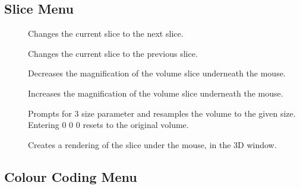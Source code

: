 \subsection{Slice Menu}

\begin{description}
\item[]  Changes the current slice to the next slice.
\item[]  Changes the current slice to the previous slice.
\item[]  Decreases the magnification of the
       volume slice underneath the mouse.
\item[]  Increases the magnification of the
       volume slice underneath the mouse.
\item[]  Prompts for 3 size parameter and
       resamples the volume to the given size.  Entering 0 0 0 resets to
       the original volume.
\item[]  Creates a rendering of the slice
       under the mouse, in the 3D window.
\end{description}

\subsection{Colour Coding Menu}

